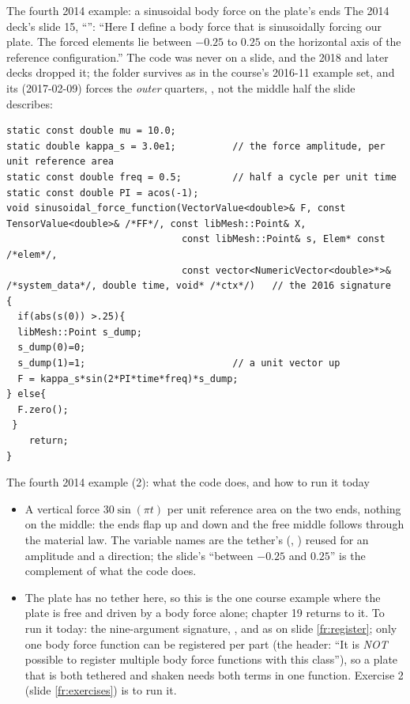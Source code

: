 \documentclass[aspectratio=169,11pt]{beamer}
\begin{document}
\begin{frame}[fragile]{The fourth 2014 example: a sinusoidal body force on the plate's ends}
\label{fr:sinus}
\scriptsize
The 2014 deck's slide 15, ``'': ``Here I define a body force that is sinusoidally forcing our plate. The forced elements lie between $-0.25$ to $0.25$ on the horizontal axis of the reference configuration.'' The code was never on a slide, and the 2018 and later decks dropped it; the folder survives as  in the course's 2016-11 example set, and its  (2017-02-09) forces the \emph{outer} quarters, , not the middle half the slide describes:
\begin{lstlisting}[style=cpptiny]
static const double mu = 10.0;
static double kappa_s = 3.0e1;          // the force amplitude, per unit reference area
static const double freq = 0.5;         // half a cycle per unit time
static const double PI = acos(-1);
void sinusoidal_force_function(VectorValue<double>& F, const TensorValue<double>& /*FF*/, const libMesh::Point& X,
                               const libMesh::Point& s, Elem* const /*elem*/,
                               const vector<NumericVector<double>*>& /*system_data*/, double time, void* /*ctx*/)   // the 2016 signature
{
  if(abs(s(0)) >.25){
  libMesh::Point s_dump;
  s_dump(0)=0;
  s_dump(1)=1;                          // a unit vector up
  F = kappa_s*sin(2*PI*time*freq)*s_dump;
} else{
  F.zero();
 }
    return;
}
\end{lstlisting}
\end{frame}

\begin{frame}{The fourth 2014 example (2): what the code does, and how to run it today}
\label{fr:sinus2}
\footnotesize
\begin{itemize}
  \item A vertical force $30\sin(\pi t)$ per unit reference area on the two ends, nothing on the middle: the ends flap up and down and the free middle follows through the material law. The variable names are the tether's (, ) reused for an amplitude and a direction; the slide's ``between $-0.25$ and $0.25$'' is the complement of what the code does.
  \item The plate has no tether here, so this is the one course example where the plate is free and driven by a body force alone; chapter 19 returns to it. To run it today: the nine-argument signature, , and  as on slide \ref{fr:register}; only one body force function can be registered per part (the header: ``It is \emph{NOT} possible to register multiple body force functions with this class''), so a plate that is both tethered and shaken needs both terms in one function. Exercise 2 (slide \ref{fr:exercises}) is to run it.
\end{itemize}
\end{frame}
\end{document}
